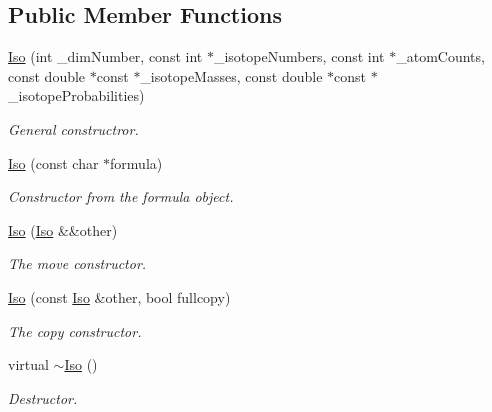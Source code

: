 \subsection*{Public Member Functions}
\begin{DoxyCompactItemize}
\item 
\mbox{\hyperlink{class_iso_spec_1_1_iso_a5ff1fafd079a866e9d61bc7d859842ea}{Iso}} (int \+\_\+dim\+Number, const int $\ast$\+\_\+isotope\+Numbers, const int $\ast$\+\_\+atom\+Counts, const double $\ast$const $\ast$\+\_\+isotope\+Masses, const double $\ast$const $\ast$\+\_\+isotope\+Probabilities)
\begin{DoxyCompactList}\small\item\em General constructror. \end{DoxyCompactList}\item 
\mbox{\label{class_iso_spec_1_1_iso_ad389effb319e9ed73db9ed5749868b81}} 
\mbox{\hyperlink{class_iso_spec_1_1_iso_ad389effb319e9ed73db9ed5749868b81}{Iso}} (const char $\ast$formula)
\begin{DoxyCompactList}\small\item\em Constructor from the formula object. \end{DoxyCompactList}\item 
\mbox{\label{class_iso_spec_1_1_iso_a6c93ecb77a11bc831cc7600797fbf837}} 
\mbox{\hyperlink{class_iso_spec_1_1_iso_a6c93ecb77a11bc831cc7600797fbf837}{Iso}} (\mbox{\hyperlink{class_iso_spec_1_1_iso}{Iso}} \&\&other)
\begin{DoxyCompactList}\small\item\em The move constructor. \end{DoxyCompactList}\item 
\mbox{\hyperlink{class_iso_spec_1_1_iso_a485cba7555fbdc64bbea19690f202b13}{Iso}} (const \mbox{\hyperlink{class_iso_spec_1_1_iso}{Iso}} \&other, bool fullcopy)
\begin{DoxyCompactList}\small\item\em The copy constructor. \end{DoxyCompactList}\item 
\mbox{\label{class_iso_spec_1_1_iso_a8cf8f90338bfc3e5117f5b491f7b523f}} 
virtual \mbox{\hyperlink{class_iso_spec_1_1_iso_a8cf8f90338bfc3e5117f5b491f7b523f}{$\sim$\+Iso}} ()
\begin{DoxyCompactList}\small\item\em Destructor. \end{DoxyCompactList}\item 

\end{DoxyCompactItemize}
